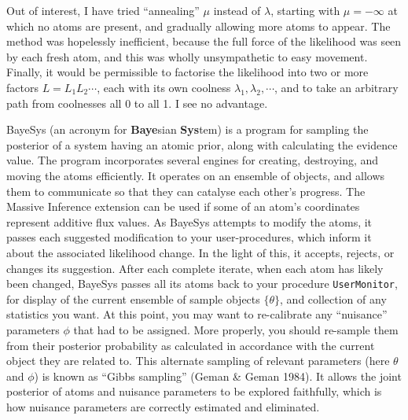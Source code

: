 Out of interest, I have tried ``annealing'' $\mu$ instead of $\lambda$, starting with $\mu = -\infty$ at which no atoms are present,
and gradually allowing more atoms to appear.
The method was hopelessly inefficient, because the full force of the likelihood was seen by each fresh atom,
and this was wholly unsympathetic to easy movement.
Finally, it would be permissible to factorise the likelihood into two or more factors $L = L_1L_2\cdots$, each with its own coolness $\lambda_1,\lambda_2,\cdots$,
and to take an arbitrary path from coolnesses all 0 to all 1.
I see no advantage.
\vfill\eject

\bigskip

BayeSys (an acronym for {\bf Baye}sian {\bf Sys}tem) is a program for sampling the posterior of a system having an atomic prior,
along with calculating the evidence value.
The program incorporates several engines for creating, destroying, and moving the atoms efficiently.
It operates on an ensemble of objects, and allows them to communicate so that they can catalyse each other's progress.
The Massive Inference extension can be used if some of an atom's coordinates represent additive flux values.
As BayeSys attempts to modify the atoms, it passes each suggested modification to your user-procedures, which inform it about the associated likelihood change.
In the light of this, it accepts, rejects, or changes its suggestion.
After each complete iterate, when each atom has likely been changed, BayeSys passes all its atoms back to your procedure {\tt UserMonitor},
for display of the current ensemble of sample objects $\{\theta\}$, and collection of any statistics you want.
At this point, you may want to re-calibrate any ``nuisance'' parameters $\phi$ that had to be assigned.
More properly, you should re-sample them from their posterior probability as calculated in accordance with the current object they are related to.
This alternate sampling of relevant parameters (here $\theta$ and $\phi$) is known as ``Gibbs sampling'' (Geman \& Geman 1984). 
It allows the joint posterior of atoms and nuisance parameters to be explored faithfully, 
which is how nuisance parameters are correctly estimated and eliminated.
\bigskip
